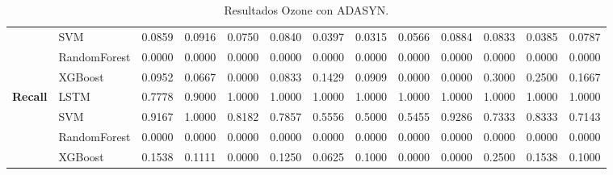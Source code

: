 \begin{table}[h]
\begin{adjustbox}{max width=15cm}
\begin{tabular}{|c|l|r|r|r|r|r|r|r|r|r|r|r|}
			& SVM &  0.0859 &  0.0916 &  0.0750 &  0.0840 &  0.0397 &  0.0315 &  0.0566 &  0.0884 &  0.0833 &  0.0385 &  0.0787 \\
			& RandomForest &  0.0000 &  0.0000 &  0.0000 &  0.0000 &  0.0000 &  0.0000 &  0.0000 &  0.0000 &  0.0000 &  0.0000 &  0.0000 \\
			& XGBoost &  0.0952 &  0.0667 &  0.0000 &  0.0833 &  0.1429 &  0.0909 &  0.0000 &  0.0000 &  0.3000 &  0.2500 &  0.1667 \\
			\hline
			\textbf{Recall} & LSTM &  0.7778 &  0.9000 &  1.0000 &  1.0000 &  1.0000 &  1.0000 &  1.0000 &  1.0000 &  1.0000 &  1.0000 &  1.0000 \\
			& SVM &  0.9167 &  1.0000 &  0.8182 &  0.7857 &  0.5556 &  0.5000 &  0.5455 &  0.9286 &  0.7333 &  0.8333 &  0.7143 \\
			& RandomForest &  0.0000 &  0.0000 &  0.0000 &  0.0000 &  0.0000 &  0.0000 &  0.0000 &  0.0000 &  0.0000 &  0.0000 &  0.0000 \\
			& XGBoost &  0.1538 &  0.1111 &  0.0000 &  0.1250 &  0.0625 &  0.1000 &  0.0000 &  0.0000 &  0.2500 &  0.1538 &  0.1000 \\
			\hline
		\end{tabular}
	\end{adjustbox}
	\caption{Resultados Ozone con ADASYN.}
	\label{tab:Ozone_ADASYN}
\end{table}
\newpage
